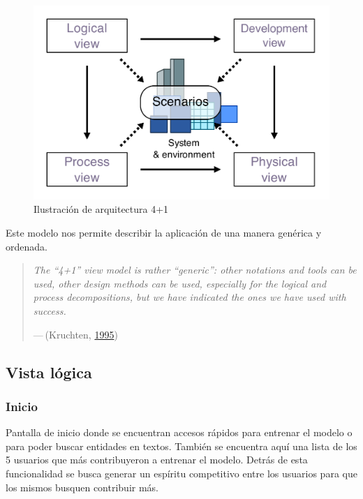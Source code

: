 \documentclass[12pt,a4paper,]{scrartcl}
\begin{document}
\begin{figure}[H]

{\centering \includegraphics{assets/4+1_Architectural_View_Model.pdf} 

}

\caption{Ilustración de arquitectura 4+1}\label{fig:arq41}
\end{figure}

Este modelo nos permite describir la aplicación de una manera genérica y ordenada.

\begin{quote}
\emph{The \enquote{4+1} view model is rather \enquote{generic}: other notations and tools can be used, other design methods can be used, especially for the logical and process decompositions, but we have indicated the ones we have used with success.}

\hfill --- (Kruchten, \protect\hyperlink{ref-Kruchten:1995:VMA:624610.625529}{1995})
\end{quote}

\hypertarget{vista-luxf3gica}{%
\subsection{Vista lógica}\label{vista-luxf3gica}}

\hypertarget{inicio}{%
\subsubsection{Inicio}\label{inicio}}

Pantalla de inicio donde se encuentran accesos rápidos para entrenar el modelo o para poder buscar entidades en textos.
También se encuentra aquí una lista de los 5 usuarios que más contribuyeron a entrenar el modelo. Detrás de esta funcionalidad se busca generar un espíritu competitivo entre los usuarios para que los mismos busquen contribuir más.
\end{document}
